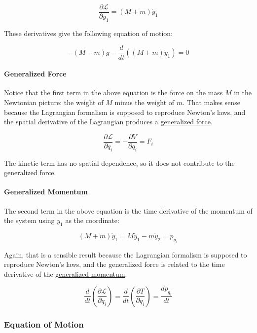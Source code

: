 \documentclass[11pt]{article}
\begin{document}
\[\dfrac{\partial \mathcal{L}}{\partial \dot{y}_1} = (M+m)\dot{y}_1\]

These derivatives give the following equation of motion:

\[-(M-m) g - \dfrac{d}{dt}\left((M+m)\dot{y}_1\right) = 0\]

\paragraph{Generalized Force}\label{generalized-force}

Notice that the first term in the above equation is the force on the
mass \(M\) in the Newtonian picture: the weight of \(M\) minus the
weight of \(m\). That makes sense because the Lagrangian formalism is
supposed to reproduce Newton's laws, and the spatial derivative of the
Lagrangian produces a
\href{https://en.wikipedia.org/wiki/Generalized_force}{generalized
force}.

\[\dfrac{\partial \mathcal{L}}{\partial q_i} = -\dfrac{\partial V}{\partial q_i} = F_i\]

The kinetic term has no spatial dependence, so it does not contribute to
the generalized force.

\paragraph{Generalized Momentum}\label{generalized-momentum}

The second term in the above equation is the time derivative of the
momentum of the system using \(y_1\) as the coordinate:

\[(M+m)\dot{y}_1 = M\dot{y}_1 - m\dot{y}_2 = p_{y_1}\]

Again, that is a sensible result because the Lagrangian formalism is
supposed to reproduce Newton's laws, and the generalized force is
related to the time derivative of the
\href{https://phys.libretexts.org/Bookshelves/Classical_Mechanics/Variational_Principles_in_Classical_Mechanics_(Cline)/07\%3A_Symmetries_Invariance_and_the_Hamiltonian/7.02\%3A_Generalized_Momentum}{generalized
momentum}.

\[\dfrac{d}{dt}\left(\dfrac{\partial \mathcal{L}}{\partial \dot{q}_i}\right) = \dfrac{d}{dt}\left(\dfrac{\partial T}{\partial \dot{q}_i}\right) = \dfrac{dp_{q_i}}{dt}\]

\subsubsection{Equation of Motion}\label{equation-of-motion}
\end{document}
